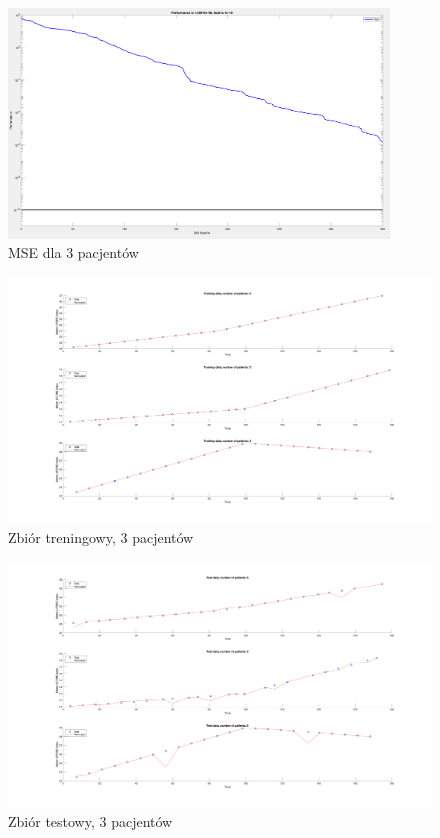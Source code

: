 \documentclass[12pt]{article}
\begin{document}
\begin{figure}[h!]

\centering
\includegraphics[width=0.9\textwidth]{mse-normal-3.png}
\caption{MSE dla 3 pacjentów}

\end{figure}

\begin{figure}[h!]

\includegraphics[width=1.05\textwidth]{training-normal-3.png}
\caption{Zbiór treningowy, 3 pacjentów}

\end{figure}

\begin{figure}[h!]

\includegraphics[width=1.0\textwidth]{test-normal-3.png}
\caption{Zbiór testowy, 3 pacjentów}

\end{figure}
\end{document}
